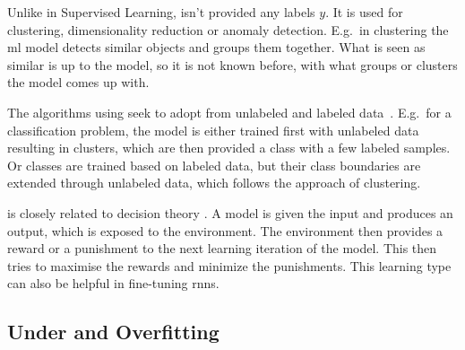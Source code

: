Unlike in Supervised Learning,  isn't provided any labels $y$.
It is used for clustering, dimensionality reduction or anomaly detection. %
E.g.\ in clustering the \gls{ml} model detects similar objects and groups them together.
What is seen as similar is up to the model, so it is not known before, with what groups or clusters the model comes up with.

The algorithms using  seek to adopt from unlabeled and labeled data~\cite{van2020survey}.
E.g.\ for a classification problem, the model is either trained first with unlabeled data resulting in clusters, which are then provided a class with a few labeled samples.
Or classes are trained based on labeled data, but their class boundaries are extended through unlabeled data, which follows the approach of clustering.


 is closely related to decision theory \cite{ghahramani2003unsupervised}.
A model is given the input and produces an output, which is exposed to the environment.
The environment then provides a reward or a punishment to the next learning iteration of the model.
This then tries to maximise the rewards and minimize the punishments.
This learning type can also be helpful in fine-tuning \gls{rnn}s.

\subsection{Under and Overfitting}
\label{subsec:under-and-overfitting}



